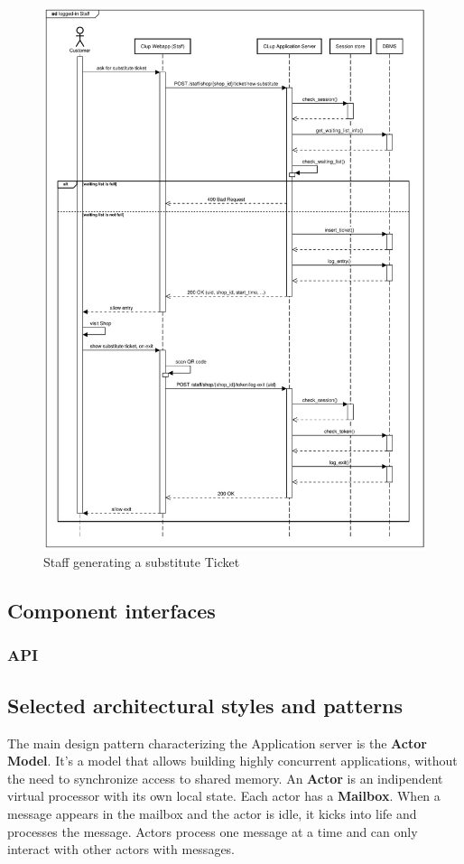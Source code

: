 \begin{figure}[H]
    \centering
    \includegraphics[width=1\textwidth]{Images/runtime_substitute.pdf}
    \caption{Staff generating a substitute Ticket}
\end{figure}

\subsection{Component interfaces}

\label{sect:api}
\subsubsection{API}
\todo{
    
}
\label{sect:patterns}
\subsection{Selected architectural styles and patterns}
The main design pattern characterizing the Application server is the \textbf{Actor Model}\cite{10.5555/1624775.1624804}. It's a model that allows building highly concurrent applications, without the need to synchronize access to shared memory.
An \textbf{Actor} is an indipendent virtual processor with its own local state. Each actor has a \textbf{Mailbox}. When a message appears in the mailbox and the actor is idle, it kicks into life and processes the message\cite{pragmatic}. Actors process one message at a time and can only interact with other actors with messages.

